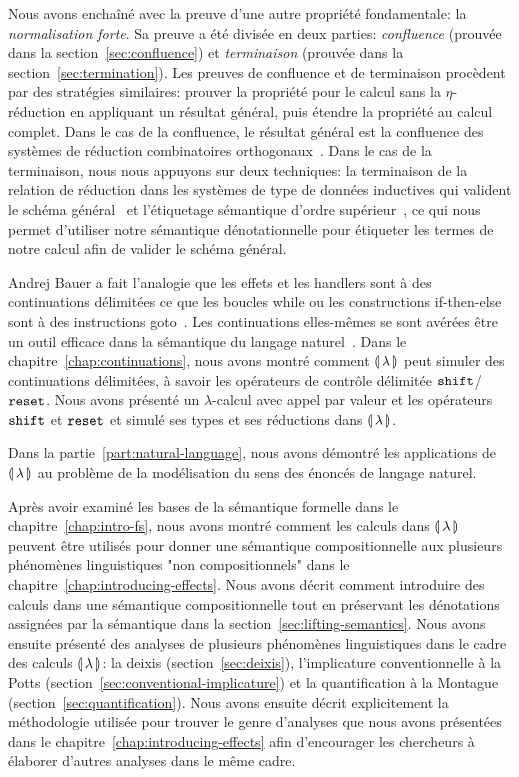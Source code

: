 Nous avons enchaîné avec la preuve d'une autre propriété fondamentale: la
\emph{normalisation forte}. Sa preuve a été divisée en deux parties:
\emph{confluence} (prouvée dans la section~\ref{sec:confluence}) et
\emph{terminaison} (prouvée dans la section~\ref{sec:termination}). Les preuves
de confluence et de terminaison procèdent par des stratégies similaires: prouver
la propriété pour le calcul sans la $\eta$-réduction en appliquant un résultat
général, puis étendre la propriété au calcul complet. Dans le cas de la
confluence, le résultat général est la confluence des systèmes de réduction
combinatoires orthogonaux~\cite{klop1993combinatory}. Dans le cas de la
terminaison, nous nous appuyons sur deux techniques: la terminaison de la
relation de réduction dans les systèmes de type de données inductives qui
valident le schéma général~\cite{blanqui2000termination} et l'étiquetage
sémantique d'ordre supérieur~\cite{hamana2007higher}, ce qui nous permet
d'utiliser notre sémantique dénotationnelle pour étiqueter les termes de notre
calcul afin de valider le schéma général.

Andrej Bauer a fait l'analogie que les effets et les handlers sont à des
continuations délimitées ce que les boucles while ou les constructions
if-then-else sont à des instructions goto~\cite{bauer2012lambda}. Les
continuations elles-mêmes se sont avérées être un outil efficace dans la
sémantique du langage
naturel~\cite{de2001type,barker2002continuations,shan2005linguistic,de2006towards,
  barker2006continuations,barker2014continuations}. Dans le
chapitre~\ref{chap:continuations}, nous avons montré comment ${\llparenthesis \, \lambda \, \rrparenthesis}$ peut
simuler des continuations délimitées, à savoir les opérateurs de contrôle
délimitée $\mathtt{shift}$/$\mathtt{reset}$. Nous avons présenté un $\lambda$-calcul avec appel
par valeur et les opérateurs $\mathtt{shift}$ et $\mathtt{reset}$ et simulé ses types et ses
réductions dans ${\llparenthesis \, \lambda \, \rrparenthesis}$.

Dans la partie~\ref{part:natural-language}, nous avons démontré les applications
de ${\llparenthesis \, \lambda \, \rrparenthesis}$ au problème de la modélisation du sens des énoncés de langage
naturel.

Après avoir examiné les bases de la sémantique formelle dans le
chapitre~\ref{chap:intro-fs}, nous avons montré comment les calculs dans ${\llparenthesis \, \lambda \, \rrparenthesis}$
peuvent être utilisés pour donner une sémantique compositionnelle aux plusieurs
phénomènes linguistiques "non compositionnels" dans le
chapitre~\ref{chap:introducing-effects}. Nous avons décrit comment introduire
des calculs dans une sémantique compositionnelle tout en préservant les
dénotations assignées par la sémantique dans la
section~\ref{sec:lifting-semantics}. Nous avons ensuite présenté des analyses de
plusieurs phénomènes linguistiques dans le cadre des calculs ${\llparenthesis \, \lambda \, \rrparenthesis}$: la deixis
(section~\ref{sec:deixis}), l'implicature conventionnelle à la Potts
(section~\ref{sec:conventional-implicature}) et la quantification à la Montague
(section~\ref{sec:quantification}). Nous avons ensuite décrit explicitement la
méthodologie utilisée pour trouver le genre d'analyses que nous avons présentées
dans le chapitre~\ref{chap:introducing-effects} afin d'encourager les chercheurs
à élaborer d'autres analyses dans le même cadre.

